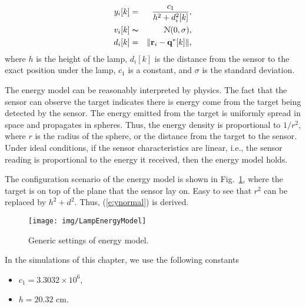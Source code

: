 \begin{mdef}
\begin{eqnarray}
  y_i[k] &=& \frac{c_1}{h^2+d_i^2[k]}, \label{e:ynormal} \\
  v_{i}[k] & \thicksim & \mathcal{N}(0,\sigma),\nonumber \\
  d_i[k] &=& \| \mathbf{r}_i-\mathbf{q^\ast}[k] \| , \nonumber
\end{eqnarray}
  where $h$ is the height of the lamp, $d_i[k]$ is the distance from the sensor to the exact position under the lamp, $c_1$ is a constant, and $\sigma$ is the standard deviation.
\end{mdef}

\begin{remark}
The energy model can be reasonably interpreted by physics. The fact that the sensor can observe the target indicates there is energy come from the target being detected by the sensor. The energy emitted from the target is uniformly spread in space and propagates in spheres. Thus, the energy density is proportional to $1/r^2$, where $r$ is the radius of the sphere, or the distance from the target to the sensor. Under ideal conditions, if the sensor characteristics are linear, i.e., the sensor reading is proportional to the energy it received, then the energy model holds.



The configuration scenario of the energy model is shown in Fig.~\ref{f:EnergyModel}, where the target is on top of the plane that the sensor lay on. Easy to see that $r^2$ can be replaced by $h^2+d^2$. Thus, (\ref{e:ynormal}) is derived.

\begin{figure}
  \centering
  \texttt{[image: img/LampEnergyModel]}
  \caption{Generic settings of energy model.}\label{f:EnergyModel}
\end{figure}


In the simulations of this chapter, we use the following constants
\begin{itemize}
  \item $c_1=3.3032\times 10^6$,
  \item $h=20.32$ cm.
\end{itemize}
\end{remark}
